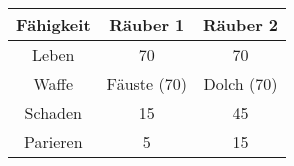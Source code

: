 \begin{tabular}{ccc}

  \toprule
  Fähigkeit & \textbf{Räuber 1} & \textbf{Räuber 2} \\
  \midrule
  Leben & 70 & 70 \\
  Waffe & Fäuste (70) & Dolch (70) \\
  Schaden & 15 & 45 \\
  Parieren & 5 & 15 \\
  \bottomrule
\end{tabular}

